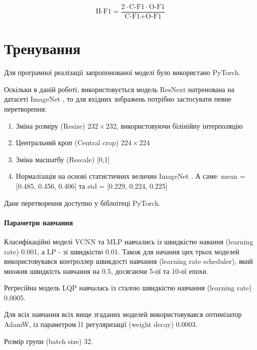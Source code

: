 \documentclass{udstu}
\begin{document}
\begin{equation}
\text{H-F1} = \frac{2 \cdot \text{C-F1} \cdot \text{O-F1}}{\text{C-F1} + \text{O-F1}}
\end{equation}


\clearpage


\section{Тренування}

Для програмної реалізації запропонованої моделі було використано PyTorch.

Оскільки в даній роботі, використовується модель ResNext \cite{resnext} натренована
на датасеті ImageNet \cite{deng2009imagenet}, то для вхідних зображень потрібно
застосувати певне перетворення:

\begin{enumerate}[1)]
	\item Зміна розміру (Resize) $232 \times 232$,
	використовуючи білінійну інтерполяцію
	\item Центральний кроп (Central crop) $224 \times 224$
	\item Зміна масшатбу (Rescale) [0,1]
	\item Нормалізація на основі статистичних величин ImageNet \cite{deng2009imagenet}.
	А саме: mean = [0.485, 0.456, 0.406] та std = [0.229, 0.224, 0.225]
\end{enumerate}

Дане перетворення доступно у біблоітеці PyTorch.


\paragraph{\textbf{Параметри навчання}\\}

Класифікаційні моделі VCNN та MLP навчались із
швидкістю навання (learning rate) 0.001, а LP - зі швидкістю 0.01.
Також для начання цих трьох моделей використовувався контроллер швикдості навчання
(learning rate scheduler), який множив швидкість навчання на 0.5, досягаючи
5-ої та 10-ої епохи.

Регресійна модель LQP навчалась із сталою швидкістю навчання (learning rate) 0.0005.

Для всіх навчання всіх вище згаданих моделей використовувався оптимізатор
AdamW, із параметром l1 регуляризації (weight decay) 0.0003.

Розмір групи (batch size) 32.
\end{document}
